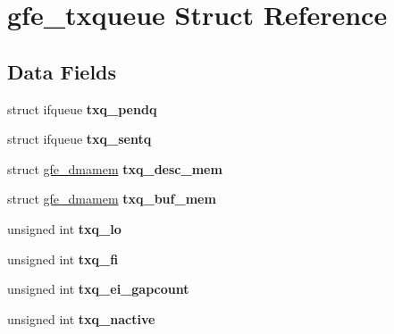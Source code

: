 \hypertarget{structgfe__txqueue}{}\section{gfe\+\_\+txqueue Struct Reference}
\label{structgfe__txqueue}
\subsection*{Data Fields}
\begin{DoxyCompactItemize}
\item 
\mbox{\label{structgfe__txqueue_ac505d1da42604f51f5db64307cfbe338}} 
struct ifqueue {\bfseries txq\+\_\+pendq}
\item 
\mbox{\label{structgfe__txqueue_a71f9924d89b361d764fa5d6938b76f7e}} 
struct ifqueue {\bfseries txq\+\_\+sentq}
\item 
\mbox{\label{structgfe__txqueue_a0311c363a585cf8adac7e903e0add2d5}} 
struct \mbox{\hyperlink{structgfe__dmamem}{gfe\+\_\+dmamem}} {\bfseries txq\+\_\+desc\+\_\+mem}
\item 
\mbox{\label{structgfe__txqueue_a7ebae8f12b912c373532f6af67dcb215}} 
struct \mbox{\hyperlink{structgfe__dmamem}{gfe\+\_\+dmamem}} {\bfseries txq\+\_\+buf\+\_\+mem}
\item 
\mbox{\label{structgfe__txqueue_a100e50644e65c10bf636bc650ad9f1aa}} 
unsigned int {\bfseries txq\+\_\+lo}
\item 
\mbox{\label{structgfe__txqueue_aecf0a19cacda1819147c9ae10f1d5b0e}} 
unsigned int {\bfseries txq\+\_\+fi}
\item 
\mbox{\label{structgfe__txqueue_ac55d431a8db6a2a72cc06d0b08b6be0c}} 
unsigned int {\bfseries txq\+\_\+ei\+\_\+gapcount}
\item 
\mbox{\label{structgfe__txqueue_a1a100eca4f3fe74f31d26fcc6c58217a}} 
unsigned int {\bfseries txq\+\_\+nactive}
\item 
\mbox{\label{structgfe__txqueue_ada0df9de4a0b03f86ed61feb0edcb4d3}} 

\end{DoxyCompactItemize}
